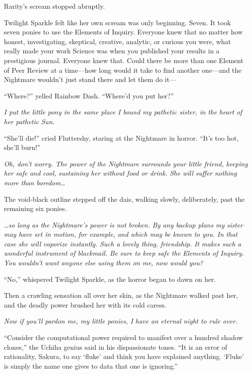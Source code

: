 Rarity’s scream stopped abruptly.

Twilight Sparkle felt like her own scream was only beginning. Seven. It took seven ponies to use the Elements of Inquiry. Everyone knew that no matter how honest, investigating, skeptical, creative, analytic, or curious you were, what really made your work Science was when you published your results in a prestigious journal. Everyone knew that. Could there be more than one Element of Peer Review at a time—how long would it take to find another one—and the Nightmare wouldn’t just stand there and let them do it—

“Where?” yelled Rainbow Dash. “Where’d you put her?”

\emph{I put the little pony in the same place I bound my pathetic sister, in the heart of her pathetic Sun.}

“She’ll die!” cried Fluttershy, staring at the Nightmare in horror. “It’s too hot, she’ll burn!”

\emph{Oh, don’t worry. The power of the Nightmare surrounds your little friend, keeping her safe and cool, sustaining her without food or drink. She will suffer nothing more than boredom…}

The void-black outline stepped off the dais, walking slowly, deliberately, past the remaining six ponies.

\emph{…so long as the Nightmare’s power is not broken. By any backup plans my sister may have set in motion, for example, and which may be known to you. In that case she will vaporize instantly. Such a lovely thing, friendship. It makes such a wonderful instrument of blackmail. Be sure to keep safe the Elements of Inquiry. You wouldn’t want anyone else using them on me, now would you?}

“No,” whispered Twilight Sparkle, as the horror began to dawn on her.

Then a crawling sensation all over her skin, as the Nightmare walked past her, and the deadly power brushed her with its cold caress.

\emph{Now if you’ll pardon me, my little ponies, I have an eternal night to rule over.}

\clearpage
{}
“Consider the computational power required to manifest over a hundred shadow clones,” the Uchiha genius said in his dispassionate tones. “It is an error of rationality, Sakura, to say ‘fluke’ and think you have explained anything. ‘Fluke’ is simply the name one gives to data that one is ignoring.”

